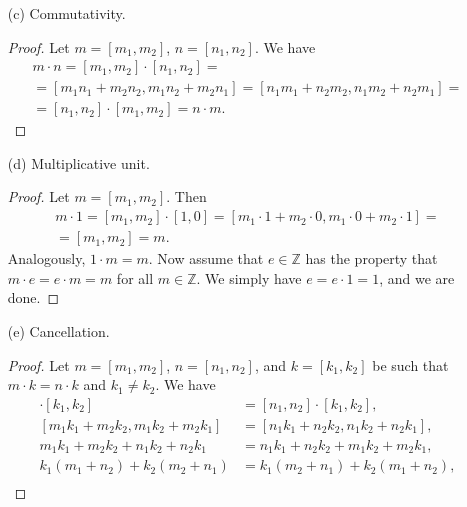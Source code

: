 \begin{problem}
\begin{enumerate}
        \item[(c)] Commutativity.
            \begin{proof}
                Let $m = [m_1, m_2]$, $n = [n_1, n_2]$. We have
                \begin{gather*}
                    m \cdot n = [m_1,m_2] \cdot [n_1,n_2] =\\=
                    [m_1n_1 + m_2n_2, m_1n_2 + m_2n_1] = [n_1m_1 + n_2m_2, n_1m_2 + n_2m_1] =\\=
                    [n_1,n_2] \cdot [m_1,m_2] = n \cdot m.
                \end{gather*}
            \end{proof}

        \item[(d)] Multiplicative unit.
            \begin{proof}
                Let $m = [m_1, m_2]$. Then
                \begin{gather*}
                    m \cdot 1 = [m_1,m_2] \cdot [1,0] = [m_1 \cdot 1 + m_2 \cdot 0, m_1 \cdot 0 + m_2 \cdot 1] =\\=
                    [m_1, m_2] = m.
                \end{gather*}
                Analogously, $1 \cdot m = m$. Now assume that $e \in \mathbb{Z}$ has the property that $m \cdot e = e \cdot m = m$ for all $m \in \mathbb{Z}$. We simply have $e = e \cdot 1 = 1$, and we are done.
            \end{proof}

        \item[(e)] Cancellation.
            \begin{proof}
                Let $m = [m_1,m_2]$, $n = [n_1,n_2]$, and $k = [k_1,k_2]$ be such that $m \cdot k = n \cdot k$ and $k_1 \ne k_2$. We have
                \begin{align*}
                    [m_1,m_2] \cdot [k_1,k_2] &= [n_1,n_2] \cdot [k_1,k_2],\\
                    [m_1k_1+m_2k_2, m_1k_2+m_2k_1] &= [n_1k_1+n_2k_2, n_1k_2+n_2k_1],\\
                    m_1k_1 + m_2k_2 + n_1k_2 + n_2k_1 &= n_1k_1 + n_2k_2 + m_1k_2 + m_2k_1,\\
                    k_1(m_1+n_2) + k_2(m_2+n_1) &= k_1(m_2+n_1) + k_2(m_1+n_2),\\
                \end{align*}
            \end{proof}
    \end{enumerate}
\end{problem}


